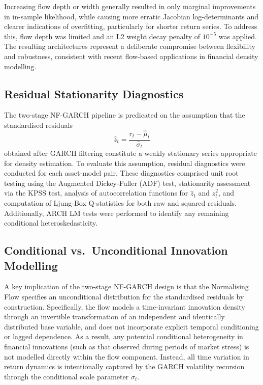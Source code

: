 \documentclass[oneside,12pt]{CUEDthesisPSnPDF}
\begin{document}
Increasing flow depth or width generally resulted in only marginal improvements in in-sample likelihood, while causing more erratic Jacobian log-determinants and clearer indications of overfitting, particularly for shorter return series. To address this, flow depth was limited and an L2 weight decay penalty of $10^{-5}$ was applied. The resulting architectures represent a deliberate compromise between flexibility and robustness, consistent with recent flow-based applications in financial density modelling. \\


\subsection{Residual Stationarity Diagnostics}
\label{subsec:resid_stationarity}
\noindent
The two-stage NF-GARCH pipeline is predicated on the assumption that the standardised residuals
\[
\hat{z}_t = \frac{r_t - \hat{\mu}_t}{\hat{\sigma}_t}
\]
obtained after GARCH filtering constitute a weakly stationary series appropriate for density estimation. To evaluate this assumption, residual diagnostics were conducted for each asset-model pair. These diagnostics comprised unit root testing using the Augmented Dickey-Fuller (ADF) test, stationarity assessment via the KPSS test, analysis of autocorrelation functions for $\hat{z}_t$ and $\hat{z}_t^2$, and computation of Ljung-Box Q-statistics for both raw and squared residuals. Additionally, ARCH LM tests were performed to identify any remaining conditional heteroskedasticity.\\



\subsection{Conditional vs.\ Unconditional Innovation Modelling}
\label{subsec:conditional_vs_unconditional}
\noindent

A key implication of the two-stage NF-GARCH design is that the Normalising Flow specifies an unconditional distribution for the standardised residuals by construction. Specifically, the flow models a time-invariant innovation density through an invertible transformation of an independent and identically distributed base variable, and does not incorporate explicit temporal conditioning or lagged dependence. As a result, any potential conditional heterogeneity in financial innovations (such as that observed during periods of market stress) is not modelled directly within the flow component. Instead, all time variation in return dynamics is intentionally captured by the GARCH volatility recursion through the conditional scale parameter $\sigma_t$.\\ 
\end{document}
